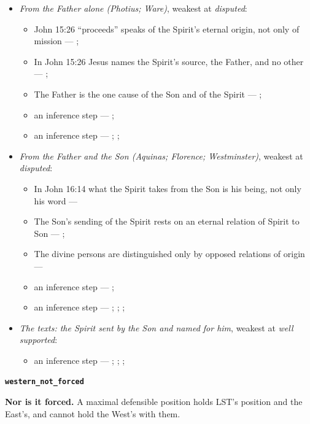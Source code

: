 \documentclass[11pt,paper=\testimonypaper,DIV=13,parskip=false]{scrartcl}
\begin{document}
\begin{itemize}
\item \emph{From the Father alone (Photius; Ware)}, weakest at \emph{disputed}:
\begin{itemize}
\item John 15:26 “proceeds” speaks of the Spirit’s eternal origin, not only of mission --- \cite[I, q. 36, a. 2]{aquinas-summa-1920}; \cite{photius-mystagogy-1987}
\item In John 15:26 Jesus names the Spirit’s source, the Father, and no other --- \cite{photius-mystagogy-1987}; \cite{ware-orthodox-church-1993}
\item The Father is the one cause of the Son and of the Spirit --- \cite{photius-mystagogy-1987}; \cite{ware-orthodox-church-1993}
\item an inference step --- \cite{photius-mystagogy-1987}; \cite[I, q. 36, a. 2]{aquinas-summa-1920}
\item an inference step --- \cite[Florence, Session 6 (1439), Laetentur caeli]{tanner-decrees-1990}; \cite{pcpcu-greek-latin-traditions-1995}; \cite{photius-mystagogy-1987}
\end{itemize}
\item \emph{From the Father and the Son (Aquinas; Florence; Westminster)}, weakest at \emph{disputed}:
\begin{itemize}
\item In John 16:14 what the Spirit takes from the Son is his being, not only his word --- \cite[I, q. 36, a. 2]{aquinas-summa-1920}
\item The Son’s sending of the Spirit rests on an eternal relation of Spirit to Son --- \cite[I, q. 36, a. 2]{aquinas-summa-1920}; \cite[165]{vischer-spirit-of-god-1981}
\item The divine persons are distinguished only by opposed relations of origin --- \cite[I, q. 36, a. 2]{aquinas-summa-1920}
\item an inference step --- \cite[I, q. 36, a. 2]{aquinas-summa-1920}; \cite{photius-mystagogy-1987}
\item an inference step --- \cite[165--169]{vischer-spirit-of-god-1981}; \cite[144]{vischer-spirit-of-god-1981}; \cite[183--184]{vischer-spirit-of-god-1981}; \cite[I, q. 43, a. 8]{aquinas-summa-1920}
\end{itemize}
\item \emph{The texts: the Spirit sent by the Son and named for him}, weakest at \emph{well supported}:
\begin{itemize}
\item an inference step --- \cite[3, The Triune God]{kibbey-living-systematic-theology-2026}; \cite{photius-mystagogy-1987}; \cite[178]{vischer-spirit-of-god-1981}; \cite[I, q. 36, a. 2]{aquinas-summa-1920}
\end{itemize}
\end{itemize}
\par\medskip\noindent\textbf{\texttt{western\_\allowbreak{}not\_\allowbreak{}forced}}\par\nobreak\noindent
\textbf{Nor is it forced.} A maximal defensible position holds LST’s position and the East’s, and cannot hold the West’s with them.
\end{document}
